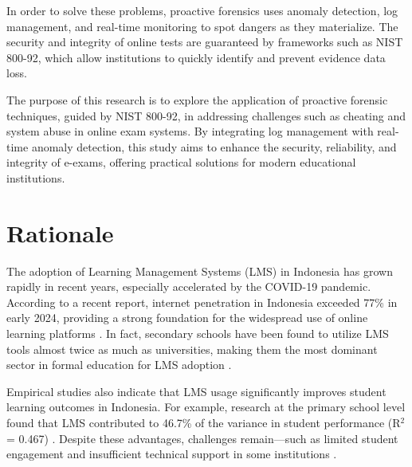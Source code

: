In order to solve these problems, proactive forensics uses anomaly detection, log management, and real-time monitoring to spot dangers as they materialize. The security and integrity of online tests are guaranteed by frameworks such as NIST 800-92, which allow institutions to quickly identify and prevent evidence data loss.

The purpose of this research is to explore the application of proactive forensic techniques, guided by NIST 800-92, in addressing challenges such as cheating and system abuse in online exam systems. By integrating log management with real-time anomaly detection, this study aims to enhance the security, reliability, and integrity of e-exams, offering practical solutions for modern educational institutions.

\section{Rationale}

The adoption of Learning Management Systems (LMS) in Indonesia has grown rapidly in recent years, especially accelerated by the COVID-19 pandemic. According to a recent report, internet penetration in Indonesia exceeded 77\% in early 2024, providing a strong foundation for the widespread use of online learning platforms \cite{intimedia2024}. In fact, secondary schools have been found to utilize LMS tools almost twice as much as universities, making them the most dominant sector in formal education for LMS adoption \cite{akubelajar2024}.

Empirical studies also indicate that LMS usage significantly improves student learning outcomes in Indonesia. For example, research at the primary school level found that LMS contributed to 46.7\% of the variance in student performance (R$^2$ = 0.467) \cite{ucy2023}. Despite these advantages, challenges remain—such as limited student engagement and insufficient technical support in some institutions \cite{edukatif2023}.

